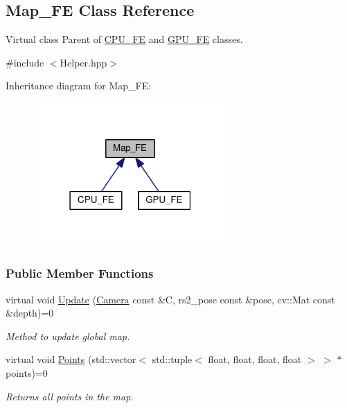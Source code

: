 \hypertarget{classMap__FE}{}\subsection{Map\+\_\+\+FE Class Reference}
\label{classMap__FE}


Virtual class Parent of \hyperlink{classCPU__FE}{C\+P\+U\+\_\+\+FE} and \hyperlink{classGPU__FE}{G\+P\+U\+\_\+\+FE} classes.  




{\ttfamily \#include $<$Helper.\+hpp$>$}



Inheritance diagram for Map\+\_\+\+FE\+:\nopagebreak
\begin{figure}[H]
\begin{center}
\leavevmode
\includegraphics[width=210pt]{classMap__FE__inherit__graph}
\end{center}
\end{figure}
\subsubsection*{Public Member Functions}
\begin{DoxyCompactItemize}
\item 
virtual void \hyperlink{classMap__FE_a901af5011ef87bfd1dac3e568ef29c47}{Update} (\hyperlink{classCamera}{Camera} const \&C, rs2\+\_\+pose const \&pose, cv\+::\+Mat const \&depth)=0
\begin{DoxyCompactList}\small\item\em Method to update global map. \end{DoxyCompactList}\item 
virtual void \hyperlink{classMap__FE_aedfee41631a7287c9eb377ccb05317d6}{Points} (std\+::vector$<$ std\+::tuple$<$ float, float, float, float $>$ $>$ $\ast$points)=0
\begin{DoxyCompactList}\small\item\em Returns all points in the map. \end{DoxyCompactList}\end{DoxyCompactItemize}


